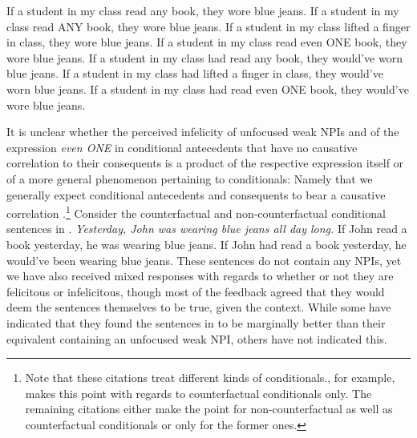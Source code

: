 \a{}\ljudge{\%} If a student in my class read any book, they wore blue jeans.
\a{}\ljudge{\#} If a student in my class read \MakeUppercase{any} book, they wore blue jeans.
\a{}\ljudge{\#} If a student in my class lifted a finger in class, they wore blue jeans.
\a{}\ljudge{\#} If a student in my class read even \MakeUppercase{one} book, they wore blue jeans.
\xe
\pex[nopreamble=true]\label{ex:npi-every-bad-analogue4}%
\a{}\ljudge{\%} If a student in my class had read any book, they would've worn blue jeans.
\a{}\ljudge{\#} 
\a{}\ljudge{\#} If a student in my class had lifted a finger in class, they would've worn blue jeans.
\a{}\ljudge{\#} If a student in my class had read even \MakeUppercase{one} book, they would've wore blue jeans.
\xe

It is unclear whether the perceived infelicity of unfocused weak NPIs and of the expression \textit{even \MakeUppercase{one}} in conditional antecedents that have no causative correlation to their consequents is a product of the respective expression itself or of a more general phenomenon pertaining to conditionals: Namely that we generally expect conditional antecedents and consequents to bear a causative correlation \parencite[see, among many others,][]{Douven2008,Schulz2011,Spohn2013,vanRooij2022}.\footnote{Note that these citations treat different kinds of conditionals.\textcite{Schulz2011}, for example, makes this point with regards to counterfactual conditionals only. The remaining citations either make the point for non-counterfactual as well as counterfactual conditionals or only for the former ones.} Consider the counterfactual and non-counterfactual conditional sentences in .
\pex[nopreamble=true]\label{ex:bluejeansconditionals}%
\textit{Yesterday, John was wearing blue jeans all day long.}
\a{}\ljudge{\%} If John read a book yesterday, he was wearing blue jeans.
\a{}\ljudge{\%} If John had read a book yesterday, he would've been wearing blue jeans.
\xe
These sentences do not contain any NPIs, yet we have also received mixed responses with regards to whether or not they are felicitous or infelicitous, though most of the feedback agreed that they would deem the sentences themselves to be true, given the context. While some have indicated that they found the sentences in  to be marginally better than their equivalent containing an unfocused weak NPI, others have not indicated this. 

